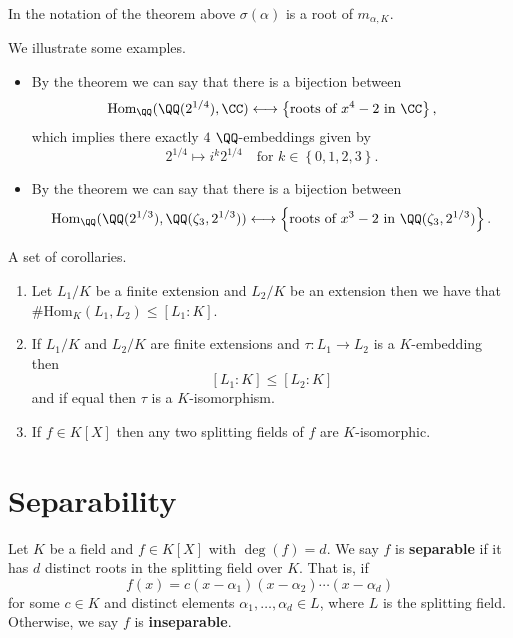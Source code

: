 \documentclass[12pt, a4paper]{article}
\begin{document}
\begin{lemma}
    In the notation of the theorem above \(\sigma(\alpha)\) is a root of \(m_{\alpha,K}\).
\end{lemma}

\begin{mdexample}
    We illustrate some examples.
    \begin{itemize}
        \item By the theorem we can say that there is a bijection between 
        \[\text{Hom}_{\QQ}(\QQ(2^{1/4}),\CC) \longleftrightarrow \left\{ \text{roots of \(x^4-2\) in \(\CC\)} \right\},\]
        which implies there exactly \(4\) \(\QQ\)-embeddings given by 
        \[2^{1/4} \mapsto i^k 2^{1/4} \quad \text{for } k\in \left\{ 0,1,2,3 \right\}.\]
        \item By the theorem we can say that there is a bijection between 
        \[\text{Hom}_{\QQ}(\QQ(2^{1/3}),\QQ(\zeta_3, 2^{1/3})) \longleftrightarrow \left\{ \text{roots of \(x^3-2\) in \(\QQ(\zeta_3,2^{1/3})\)} \right\}.\]
    \end{itemize}
\end{mdexample}

\begin{mdcor}
    A set of corollaries.
    \begin{enumerate}
        \item Let \(L_1/K\) be a finite extension and \(L_2/K\) be an extension then we have that \({\#\text{Hom}_K(L_1,L_2) \leq [L_1:K]}\).
        \item If \(L_1/K\) and \(L_2/K\) are finite extensions and \(\tau : L_1\to L_2\) is a \(K\)-embedding then 
        \[[L_1:K] \leq [L_2:K]\]
        and if equal then \(\tau\) is a \(K\)-isomorphism.
        \item If \(f \in K[X]\) then any two splitting fields of \(f\) are \(K\)-isomorphic.
    \end{enumerate}
\end{mdcor}


\section{Separability}

\begin{definition}
    Let \(K\) be a field and \(f\in K[X]\) with \(\deg(f)=d\). We say \(f\) is \textbf{separable} if it has \(d\) distinct roots in the splitting field over \(K\). That is, if 
    \[f(x)=c(x-\alpha_1)(x-\alpha_2)\cdots(x-\alpha_d)\]
    for some \(c\in K\) and distinct elements \(\alpha_1,\ldots,\alpha_d \in L\), where \(L\) is the splitting field.
    Otherwise, we say \(f\) is \textbf{inseparable}.
\end{definition}
\end{document}
